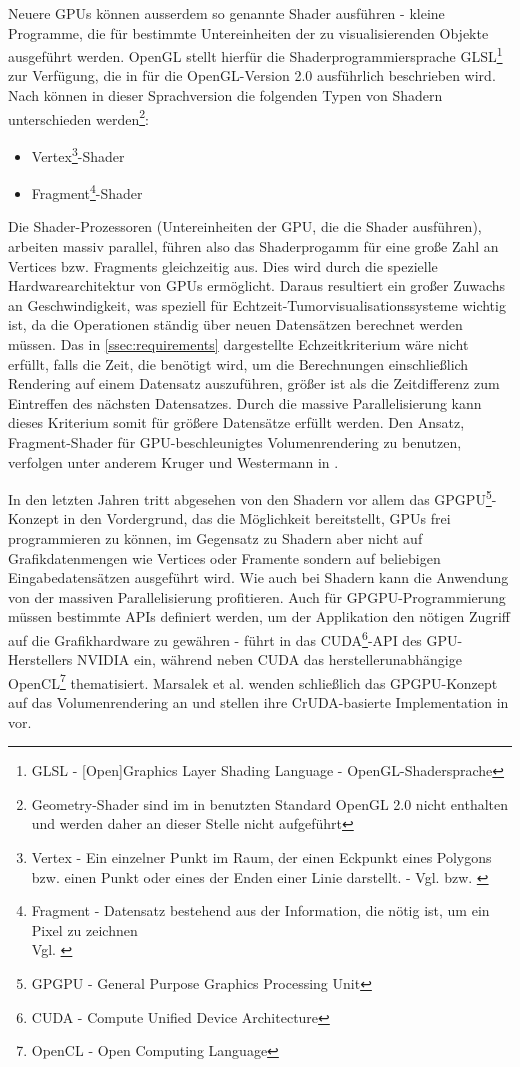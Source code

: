 \documentclass[pdftex,a4paper,titlepage,12pt]{scrartcl}
\newtheorem[L]{boxedDefinition}{Definition}
\begin{document}
\marginpar[Shader]{}\label{m:shader}Neuere GPUs können ausserdem so genannte Shader ausführen - kleine Programme, die für bestimmte Untereinheiten der zu visualisierenden Objekte ausgeführt werden. OpenGL stellt hierfür die Shaderprogrammiersprache GLSL\footnote{GLSL - [Open]Graphics Layer Shading Language - OpenGL-Shadersprache} zur Verfügung, die in \cite{Rost2006} für die OpenGL-Version 2.0 ausführlich beschrieben wird. Nach \cite[Seite 38-47]{Rost2006} können in dieser Sprachversion die folgenden Typen von Shadern unterschieden werden\footnote{Geometry-Shader sind im in \cite{Rost2006} benutzten Standard OpenGL 2.0 nicht enthalten und werden daher an dieser Stelle nicht aufgeführt}:
\begin{itemize}
 \item Vertex\footnote{Vertex - Ein einzelner Punkt im Raum, der einen Eckpunkt eines Polygons bzw. einen Punkt oder eines der Enden einer Linie darstellt. - Vgl. \cite[Seite 664]{Wright2000} bzw. \cite[Seite 685]{Rost2006}}-Shader
 \item Fragment\footnote{Fragment - Datensatz bestehend aus der Information, die nötig ist, um ein Pixel zu zeichnen\\Vgl. \cite[Seite 675]{Rost2006}}-Shader
\end{itemize}
Die Shader-Prozessoren (Untereinheiten der GPU, die die Shader ausführen), arbeiten massiv parallel, führen also das Shaderprogamm für eine große Zahl an Vertices bzw. Fragments gleichzeitig aus. Dies wird durch die spezielle Hardwarearchitektur von GPUs ermöglicht. Daraus resultiert ein großer Zuwachs an Geschwindigkeit, was speziell für Echtzeit-Tumorvisualisationssysteme wichtig ist, da die Operationen ständig über neuen Datensätzen berechnet werden müssen. Das in \vref{ssec:requirements} dargestellte Echzeitkriterium wäre nicht erfüllt, falls die Zeit, die benötigt wird, um die Berechnungen einschließlich Rendering auf einem Datensatz auszuführen, größer ist als die Zeitdifferenz zum Eintreffen des nächsten Datensatzes. Durch die massive Parallelisierung kann dieses Kriterium somit für größere Datensätze erfüllt werden.
Den Ansatz, Fragment-Shader für GPU-beschleunigtes Volumenrendering zu benutzen, verfolgen unter anderem Kruger und Westermann in \cite{Kruger2003}.

\marginpar[GPGPU]{}\label{m:gpgpu}In den letzten Jahren tritt abgesehen von den Shadern vor allem das GPGPU\footnote{GPGPU - General Purpose Graphics Processing Unit}-Konzept in den Vordergrund, das die Möglichkeit bereitstellt, GPUs frei programmieren zu können, im Gegensatz zu Shadern aber nicht auf Grafikdatenmengen wie Vertices oder Framente sondern auf beliebigen Eingabedatensätzen ausgeführt wird. Wie auch bei Shadern kann die Anwendung von der massiven Parallelisierung profitieren. Auch für GPGPU-Programmierung müssen bestimmte APIs definiert werden, um der Applikation den nötigen Zugriff auf die Grafikhardware zu gewähren - \cite{Sanders2010} führt in das CUDA\footnote{CUDA - Compute Unified Device Architecture}-API des GPU-Herstellers NVIDIA ein, während \cite{Kirk2010} neben CUDA das herstellerunabhängige OpenCL\footnote{OpenCL - Open Computing Language} thematisiert. Marsalek et al. wenden schließlich das GPGPU-Konzept auf das Volumenrendering an und stellen ihre CrUDA-basierte Implementation in \cite{Marsalek2008} vor.
\end{document}
